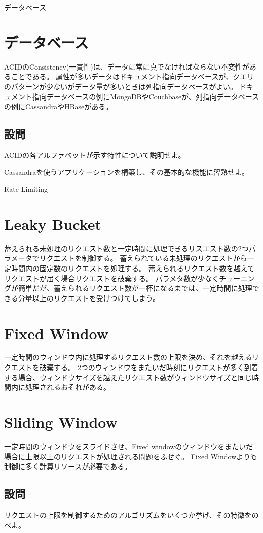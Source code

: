 \documentclass[book]{jlreq}
\begin{document}
\begin{chapter-bib}{データベース}
  \section{データベース}
  ACIDのConsistency(一貫性)は、データに常に真でなければならない不変性があることである\cite{ddia}。
  属性が多いデータはドキュメント指向データベースが、クエリのパターンが少ないがデータ量が多いときは列指向データベースがよい\cite{lc-databases}。
  ドキュメント指向データベースの例にMongoDBやCouchbaseが、列指向データベースの例にCassandraやHBaseがある。
  \subsection{設問}
  \begin{exercise}
  \item ACIDの各アルファベットが示す特性について説明せよ。
  \item Cassandraを使うアプリケーションを構築し、その基本的な機能に習熟せよ。
  \end{exercise}
\end{chapter-bib}
\begin{chapter-bib}{Rate Limiting}
  \section{Leaky Bucket}
  蓄えられる未処理のリクエスト数と一定時間に処理できるリスエスト数の2つパラメータでリクエストを制御する\cite{sdi}。
  蓄えられている未処理のリクエストから一定時間内の固定数のリクエストを処理する。
  蓄えられるリクエスト数を越えてリクエストが届く場合リクエストを破棄する。
  パラメタ数が少なくチューニングが簡単だが、蓄えられるリクエスト数が一杯になるまでは、一定時間に処理できる分量以上のリクエストを受けつけてしまう。
  \section{Fixed Window}
  一定時間のウィンドウ内に処理するリクエスト数の上限を決め、それを越えるリクエストを破棄する。
  2つのウィンドウをまたいだ時刻にリクエストが多く到着する場合、ウィンドウサイズを越えたリクエスト数がウィンドウサイズと同じ時間内に処理されるおそれがある。
  \section{Sliding Window}
  一定時間のウィンドウをスライドさせ、Fixed windowのウィンドウをまたいだ場合に上限以上のリクエストが処理される問題をふせぐ。
  Fixed Windowよりも制御に多く計算リソースが必要である。
  \subsection{設問}
  \begin{exercise}
  \item リクエストの上限を制御するためのアルゴリズムをいくつか挙げ、その特徴をのべよ。
  \end{exercise}
\end{chapter-bib}
\end{document}
